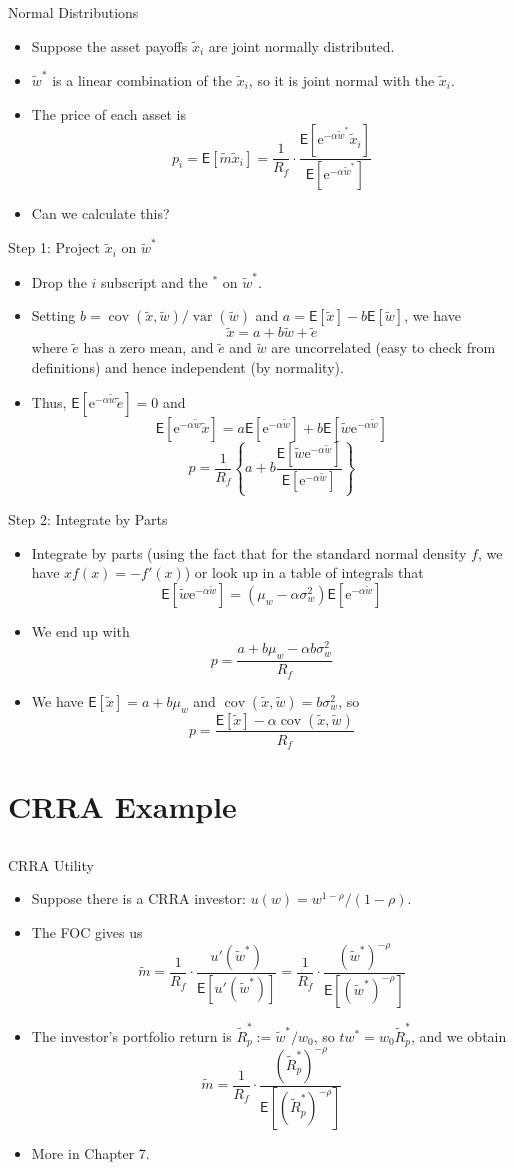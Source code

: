 \documentclass[10pt]{beamer}
\DeclareMathOperator{\var}{var}
\DeclareMathOperator{\cov}{cov}
\newcommand{\bi}{\begin{itemize}}
\newcommand{\ei}{\end{itemize}}
\newcommand{\im}{\item}
\newcommand{\E}{\mathrm{e}}
\newcommand{\mye}{\ensuremath{\mathsf{E}}}
\newcommand{\tw}{\tilde{w}}
\newcommand{\te}{\tilde{e}}
\newcommand{\tx}{\tilde{x}}
\newcommand{\tm}{\tilde{m}}
\newcommand{\tr}{\widetilde{R}}
\newcommand{\tr}{\widetilde{\mathbf{R}}}
\begin{document}
\begin{frame}{Normal Distributions}
    \bi 
    \im Suppose the asset payoffs $\tx_i$ are joint normally distributed.
    \im $\tw^*$ is a linear combination of the $\tx_i$, so it is joint normal with the $\tx_i$.
   \im The price of each asset is 
   $$p_i = \mye[\tm \tx_i] = \frac{1}{R_f} \cdot \frac{\mye[\E^{-\alpha \tw^*}\tx_i]}{\mye[\E^{-\alpha \tw^*}]}$$
   \im Can we calculate this?
   \ei
\end{frame}


\begin{frame}{Step 1: Project $\tx_i$ on $\tw^*$}
    \bi 
    \im Drop the $i$ subscript and the $^*$ on $\tw^*$.
    \im Setting $b=\cov(\tx,\tw)/\var(\tw)$ and $a=\mye[\tx]-b\mye[\tw]$, we have
    $$\tx = a + b\tw + \te$$
    where $\te$ has a zero mean, and $\te$ and $\tw$ are uncorrelated (easy to check from definitions) and hence independent (by normality).
    \im Thus, $\mye[\E^{-\alpha \tw}\te] = 0$ and
    $$\mye[\E^{-\alpha \tw}\tx] = a\mye[\E^{-\alpha \tw}] + b\mye[\tw \E^{-\alpha \tw}]$$
    $$p = \frac{1}{R_f}\left\{a + b \frac{\mye[\tw \E^{-\alpha \tw}]}{\mye[\E^{-\alpha \tw}]}\right\}$$
    \ei
\end{frame}

\begin{frame}{Step 2: Integrate by Parts}
    \bi
    \im Integrate by parts (using the fact that for the standard normal density $f$, we have $xf(x) = - f'(x)$) or look up in a table of integrals that
    $$\mye[\tw \E^{-\alpha \tw}] = (\mu_w-\alpha \sigma_w^2)\mye[\E^{-\alpha \tw}]$$
    \im We end up with 
    $$p = \frac{a + b \mu_w - \alpha b \sigma_w^2}{R_f}$$
    \im We have $\mye[\tx] = a + b \mu_w$ and $\cov(\tx, \tw) = b\sigma_w^2$, so
    $$p = \frac{\mye[\tx] - \alpha \cov(\tx,\tw)}{R_f}$$
    \ei
    \end{frame}

  
\section{CRRA Example}
\subsection{}

\begin{frame}{CRRA Utility}
    \bi
\im Suppose there is a CRRA investor: $u(w) = w^{1-\rho}/(1-\rho)$.
\im The FOC gives us 
$$\tm =  \frac{1}{R_f} \cdot \frac{u'(\tw^*)}{\mye[u'(\tw^*)]} = \frac{1}{R_f} \cdot \frac{(\tw^*)^{-\rho}}{\mye[(\tw^*)^{-\rho}]}$$
\im The investor's portfolio return is $\tr^*_p := \tw^*/w_0$, so $tw^* = w_0 \tr^*_p$, and we obtain
$$\tm = \frac{1}{R_f} \cdot \frac{(\tr_p^*)^{-\rho}}{\mye[(\tr_p^*)^{-\rho}]}$$
\im More in Chapter 7.
\ei 
\end{frame}
\end{document}
